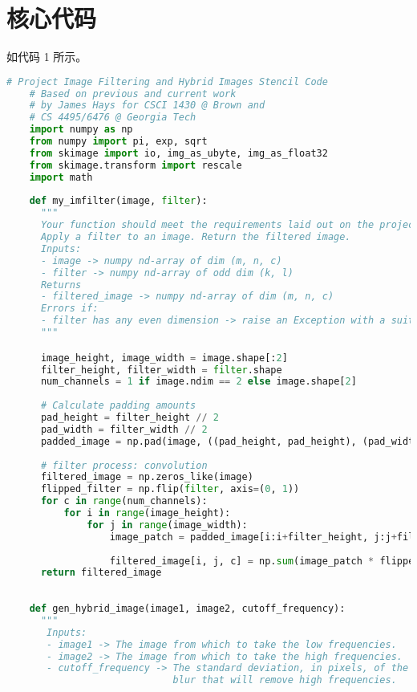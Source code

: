\section{核心代码}

如代码 1 所示。

\begin{lstlisting}[caption={student.py}, label={lst:code-example}, captionpos=t, language=python]
    # Project Image Filtering and Hybrid Images Stencil Code
    # Based on previous and current work
    # by James Hays for CSCI 1430 @ Brown and
    # CS 4495/6476 @ Georgia Tech
    import numpy as np
    from numpy import pi, exp, sqrt
    from skimage import io, img_as_ubyte, img_as_float32
    from skimage.transform import rescale
    import math
    
    def my_imfilter(image, filter):
      """
      Your function should meet the requirements laid out on the project webpage.
      Apply a filter to an image. Return the filtered image.
      Inputs:
      - image -> numpy nd-array of dim (m, n, c)
      - filter -> numpy nd-array of odd dim (k, l)
      Returns
      - filtered_image -> numpy nd-array of dim (m, n, c)
      Errors if:
      - filter has any even dimension -> raise an Exception with a suitable error message.
      """

      image_height, image_width = image.shape[:2]
      filter_height, filter_width = filter.shape
      num_channels = 1 if image.ndim == 2 else image.shape[2]
    
      # Calculate padding amounts
      pad_height = filter_height // 2
      pad_width = filter_width // 2
      padded_image = np.pad(image, ((pad_height, pad_height), (pad_width, pad_width), (0, 0) if num_channels > 1 else (0, 0)), mode='reflect')
    
      # filter process: convolution
      filtered_image = np.zeros_like(image)
      flipped_filter = np.flip(filter, axis=(0, 1))
      for c in range(num_channels):
          for i in range(image_height):
              for j in range(image_width):
                  image_patch = padded_image[i:i+filter_height, j:j+filter_width, c] if num_channels > 1 else padded_image[i:i+filter_height, j:j+filter_width]
                  
                  filtered_image[i, j, c] = np.sum(image_patch * flipped_filter) if num_channels > 1 else np.sum(image_patch * flipped_filter)
      return filtered_image
    
    
    def gen_hybrid_image(image1, image2, cutoff_frequency):
      """
       Inputs:
       - image1 -> The image from which to take the low frequencies.
       - image2 -> The image from which to take the high frequencies.
       - cutoff_frequency -> The standard deviation, in pixels, of the Gaussian
                             blur that will remove high frequencies.
    

\end{lstlisting}
